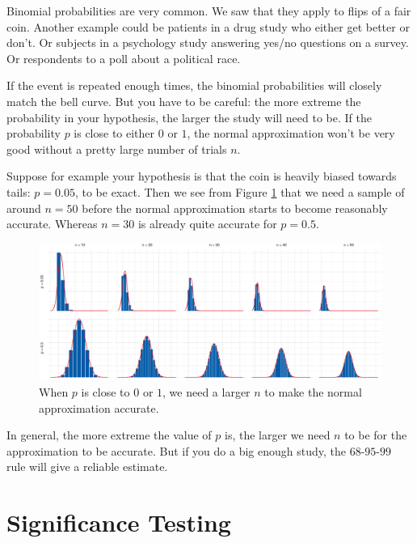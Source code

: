 \documentclass[justified]{tufte-book}
\theoremstyle{definition}
\theoremstyle{definition}
\theoremstyle{definition}
\theoremstyle{remark}
\begin{document}
Binomial probabilities are very common. We saw that they apply to flips
of a fair coin. Another example could be patients in a drug study who
either get better or don't. Or subjects in a psychology study answering
yes/no questions on a survey. Or respondents to a poll about a political
race.

If the event is repeated enough times, the binomial probabilities will
closely match the bell curve. But you have to be careful: the more
extreme the probability in your hypothesis, the larger the study will
need to be. If the probability \(p\) is close to either \(0\) or \(1\),
the normal approximation won't be very good without a pretty large
number of trials \(n\).

Suppose for example your hypothesis is that the coin is heavily biased
towards tails: \(p = 0.05\), to be exact. Then we see from Figure
\ref{fig:npgrid} that we need a sample of around \(n = 50\) before the
normal approximation starts to become reasonably accurate. Whereas
\(n = 30\) is already quite accurate for \(p = 0.5\).

\begin{figure}
\includegraphics{_main_files/figure-latex/npgrid-1} \caption[When $p$ is close to $0$ or $1$, we need a larger $n$ to make the normal approximation accurate]{When $p$ is close to $0$ or $1$, we need a larger $n$ to make the normal approximation accurate.}\label{fig:npgrid}
\end{figure}

In general, the more extreme the value of \(p\) is, the larger we need
\(n\) to be for the approximation to be accurate. But if you do a big
enough study, the \(68\)-\(95\)-\(99\) rule will give a reliable
estimate.

\hypertarget{significance-testing-1}{%
\section{Significance Testing}\label{significance-testing-1}}
\end{document}
